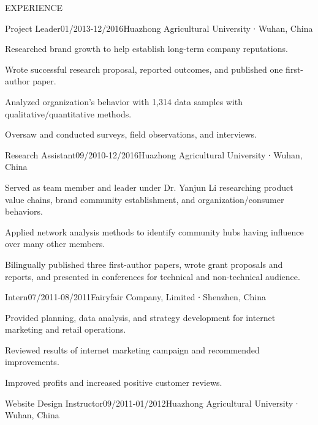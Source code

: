 \documentclass{resume} %
\begin{document}
\begin{minipage}[t]{0.66\textwidth}
\begin{rSection}{EXPERIENCE}
\begin{rSubsection}{Project Leader}{01/2013-12/2016}{Huazhong Agricultural University ∙ Wuhan, China} {}
 \item Researched brand growth to help establish long-term company reputations. 
 \item Wrote successful research proposal, reported outcomes, and published one first-author paper. 
 \item Analyzed organization’s behavior with 1,314 data samples with qualitative/quantitative methods.
 \item Oversaw and conducted surveys, field observations, and interviews.
\end{rSubsection}



\begin{rSubsection}{Research Assistant}{09/2010-12/2016}{Huazhong Agricultural University ∙ Wuhan, China} {}
 \item Served as team member and leader under Dr. Yanjun Li researching product value chains, brand community establishment, and organization/consumer behaviors.  
 \item Applied network analysis methods to identify community hubs having influence over many other members.
 \item Bilingually published three first-author papers, wrote grant proposals and reports, and presented in conferences for technical and non-technical audience.
\end{rSubsection}


\begin{rSubsection}{Intern}{07/2011-08/2011}{Fairyfair Company, Limited ∙ Shenzhen, China} {}
 \item Provided planning, data analysis, and strategy development for internet marketing and retail operations.  
 \item Reviewed results of internet marketing campaign and recommended improvements.
 \item Improved profits and increased positive customer reviews. 
\end{rSubsection}



\begin{rSubsection}{Website Design Instructor}{09/2011-01/2012}{Huazhong Agricultural University ∙ Wuhan, China} {}
\item   
\end{rSubsection}
 
\end{rSection}

\end{minipage}
\end{document}
